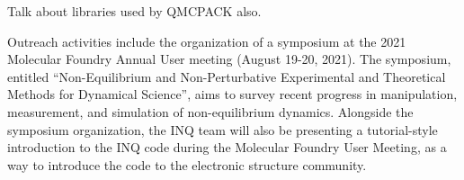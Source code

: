 Talk about libraries used by QMCPACK also.


Outreach activities include the organization of a symposium at the 2021 Molecular Foundry Annual User meeting (August 19-20, 2021). The symposium, entitled “Non-Equilibrium and Non-Perturbative Experimental and Theoretical Methods for Dynamical Science”, aims to survey recent progress in manipulation, measurement, and simulation of non-equilibrium dynamics. Alongside the symposium organization, the INQ team will also be presenting a tutorial-style introduction to the INQ code during the Molecular Foundry User Meeting, as a way to introduce the code to the electronic structure community. 

\clearpage
